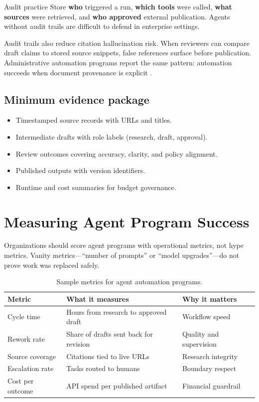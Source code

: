 \begin{insightbox}{Audit practice}
Store \textbf{who} triggered a run, \textbf{which tools} were called, \textbf{what sources}
were retrieved, and \textbf{who approved} external publication. Agents without audit trails
are difficult to defend in enterprise settings.
\end{insightbox}

Audit trails also reduce citation hallucination risk. When reviewers can compare draft
claims to stored source snippets, false references surface before publication.
Administrative automation programs report the same pattern: automation succeeds when
document provenance is explicit \cite{recomaijobroles}.

\subsection{Minimum evidence package}
\begin{itemize}
  \item Timestamped source records with URLs and titles.
  \item Intermediate drafts with role labels (research, draft, approval).
  \item Review outcomes covering accuracy, clarity, and policy alignment.
  \item Published outputs with version identifiers.
  \item Runtime and cost summaries for budget governance.
\end{itemize}

\section{Measuring Agent Program Success}
\label{sec:metrics}

Organizations should score agent programs with operational metrics, not hype metrics.
Vanity metrics---``number of prompts'' or ``model upgrades''---do not prove work was replaced
safely.

\begin{table}[htbp]
  \centering
  \caption{Sample metrics for agent automation programs.}
  \label{tab:agent-metrics}
  \small
  \begin{tabularx}{\linewidth}{@{}lXX@{}}
    \toprule
    \textbf{Metric} & \textbf{What it measures} & \textbf{Why it matters} \\
    \midrule
    Cycle time & Hours from research to approved draft & Workflow speed \\
    Rework rate & Share of drafts sent back for revision & Quality and supervision \\
    Source coverage & Citations tied to live URLs & Research integrity \\
    Escalation rate & Tasks routed to humans & Boundary respect \\
    Cost per outcome & API spend per published artifact & Financial guardrail \\
    \bottomrule
  \end{tabularx}
\end{table}

